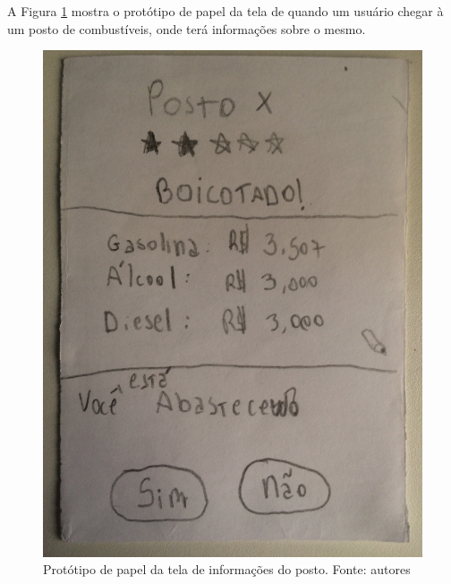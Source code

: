 A Figura \ref{img:prototipo_de_papel_info_posto} mostra o protótipo de papel da tela de quando um usuário chegar à um posto de combustíveis, onde terá informações sobre o mesmo.
\begin{figure}[H]
    \centering
    \includegraphics[scale=0.1, angle=-90]{figuras/prototipo_papel_info_posto.jpg}
    \caption[Protótipo de papel da tela de informações do posto]{Protótipo de papel da tela de informações do posto. Fonte: autores}
    \label{img:prototipo_de_papel_info_posto}
\end{figure}
 \pagebreak

